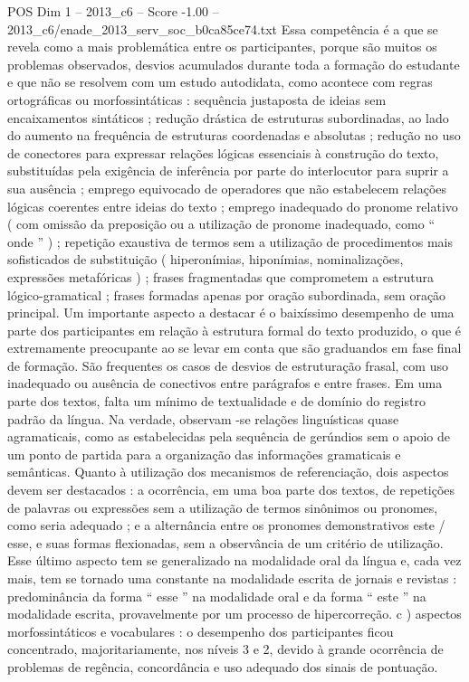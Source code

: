 \begin{textsample}{POS Dim 1 – 2013\_c6 – Score -1.00 – 2013\_c6/enade\_2013\_serv\_soc\_b0ca85ce74.txt}
Essa competência é a que se revela como a mais problemática entre os participantes, porque são muitos os problemas observados, desvios acumulados durante toda a formação do estudante e que não se resolvem com um estudo autodidata, como acontece com regras ortográficas ou morfossintáticas : sequência justaposta de ideias sem encaixamentos sintáticos ; redução drástica de estruturas subordinadas, ao lado do aumento na frequência de estruturas coordenadas e absolutas ; redução no uso de conectores para expressar relações lógicas essenciais à construção do texto, substituídas pela exigência de inferência por parte do interlocutor para suprir a sua ausência ; emprego equivocado de operadores que não estabelecem relações lógicas coerentes entre ideias do texto ; emprego inadequado do pronome relativo ( com omissão da preposição ou a utilização de pronome inadequado, como “ onde ” ) ; repetição exaustiva de termos sem a utilização de procedimentos mais sofisticados de substituição ( hiperonímias, hiponímias, nominalizações, expressões metafóricas ) ; frases fragmentadas que comprometem a estrutura lógico-gramatical ; frases formadas apenas por oração subordinada, sem oração principal.
Um importante aspecto a destacar é o baixíssimo desempenho de uma parte dos participantes em relação à estrutura formal do texto produzido, o que é extremamente preocupante ao se levar em conta que são graduandos em fase final de formação.
São frequentes os casos de desvios de estruturação frasal, com uso inadequado ou ausência de conectivos entre parágrafos e entre frases.
Em uma parte dos textos, falta um mínimo de textualidade e de domínio do registro padrão da língua.
Na verdade, observam -se relações linguísticas quase agramaticais, como as estabelecidas pela sequência de gerúndios sem o apoio de um ponto de partida para a organização das informações gramaticais e semânticas.
Quanto à utilização dos mecanismos de referenciação, dois aspectos devem ser destacados : a ocorrência, em uma boa parte dos textos, de repetições de palavras ou expressões sem a utilização de termos sinônimos ou pronomes, como seria adequado ; e a alternância entre os pronomes demonstrativos este / esse, e suas formas flexionadas, sem a observância de um critério de utilização.
Esse último aspecto tem se generalizado na modalidade oral da língua e, cada vez mais, tem se tornado uma constante na modalidade escrita de jornais e revistas : predominância da forma “ esse ” na modalidade oral e da forma “ este ” na modalidade escrita, provavelmente por um processo de hipercorreção. c ) aspectos morfossintáticos e vocabulares : o desempenho dos participantes ficou concentrado, majoritariamente, nos níveis 3 e 2, devido à grande ocorrência de problemas de regência, concordância e uso adequado dos sinais de pontuação.

\end{textsample}
